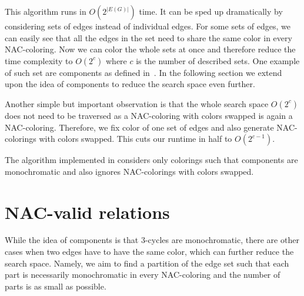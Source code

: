 This algorithm runs in \( O(2^{|E(G)|}) \) time.
It can be sped up dramatically by considering sets of edges instead of individual edges.
For some sets of edges, we can easily see that all the edges in the set need to share
the same color in every NAC-coloring.
Now we can color the whole sets at once
and therefore reduce the time complexity to \( O(2^{c}) \)
where \( c \) is the number of described sets.
One example of such set are \trcon{} components
as defined in~.
In the following section we extend upon the idea of \trcon{} components
to reduce the search space even further.

Another simple but important observation is that the whole search space \( O(2^{c}) \)
does not need to be traversed as a NAC-coloring with colors swapped is again a NAC-coloring.
Therefore, we fix color of one set of edges and also generate NAC-colorings with colors swapped.
This cuts our runtime in half to \( O(2^{c-1}) \).

The algorithm implemented in \flexrilog{}
considers only colorings such that \trcon{} components are monochromatic
and also ignores NAC-colorings with colors swapped.

\section{NAC-valid relations}%
\label{sec:NACvalid}

While the idea of \trcon{} components is that 3-cycles are monochromatic,
there are other cases when two edges have to have the same color,
which can further reduce the search space.
Namely, we aim to find a partition of the edge set such that each part is necessarily monochromatic
in every NAC-coloring and the number of parts is as small as possible.

